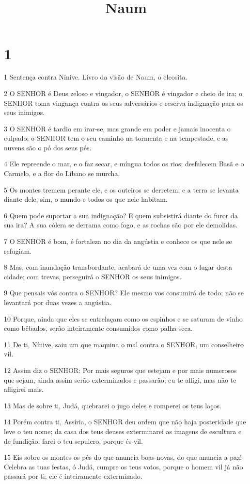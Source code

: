 

\title{Naum}


\chapter{1}

\par 1 Sentença contra Nínive. Livro da visão de Naum, o elcosita.
\par 2 O SENHOR é Deus zeloso e vingador, o SENHOR é vingador e cheio de ira; o SENHOR toma vingança contra os seus adversários e reserva indignação para os seus inimigos.
\par 3 O SENHOR é tardio em irar-se, mas grande em poder e jamais inocenta o culpado; o SENHOR tem o seu caminho na tormenta e na tempestade, e as nuvens são o pó dos seus pés.
\par 4 Ele repreende o mar, e o faz secar, e míngua todos os rios; desfalecem Basã e o Carmelo, e a flor do Líbano se murcha.
\par 5 Os montes tremem perante ele, e os outeiros se derretem; e a terra se levanta diante dele, sim, o mundo e todos os que nele habitam.
\par 6 Quem pode suportar a sua indignação? E quem subsistirá diante do furor da sua ira? A sua cólera se derrama como fogo, e as rochas são por ele demolidas.
\par 7 O SENHOR é bom, é fortaleza no dia da angústia e conhece os que nele se refugiam.
\par 8 Mas, com inundação transbordante, acabará de uma vez com o lugar desta cidade; com trevas, perseguirá o SENHOR os seus inimigos.
\par 9 Que pensais vós contra o SENHOR? Ele mesmo vos consumirá de todo; não se levantará por duas vezes a angústia.
\par 10 Porque, ainda que eles se entrelaçam como os espinhos e se saturam de vinho como bêbados, serão inteiramente consumidos como palha seca.
\par 11 De ti, Nínive, saiu um que maquina o mal contra o SENHOR, um conselheiro vil.
\par 12 Assim diz o SENHOR: Por mais seguros que estejam e por mais numerosos que sejam, ainda assim serão exterminados e passarão; eu te afligi, mas não te afligirei mais.
\par 13 Mas de sobre ti, Judá, quebrarei o jugo deles e romperei os teus laços.
\par 14 Porém contra ti, Assíria, o SENHOR deu ordem que não haja posteridade que leve o teu nome; da casa dos teus deuses exterminarei as imagens de escultura e de fundição; farei o teu sepulcro, porque és vil.
\par 15 Eis sobre os montes os pés do que anuncia boas-novas, do que anuncia a paz! Celebra as tuas festas, ó Judá, cumpre os teus votos, porque o homem vil já não passará por ti; ele é inteiramente exterminado.

